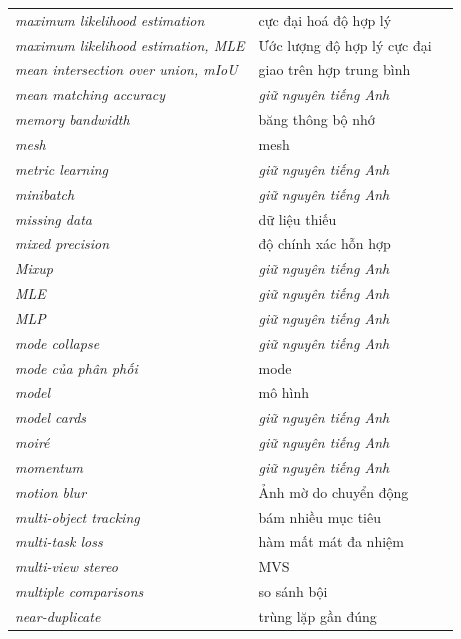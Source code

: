 \documentclass[deep_learning.tex]{subfiles}
\begin{document}
\begin{longtable}{@{}L{5.2cm}L{5.9cm}L{2.6cm}@{}}
\emph{maximum likelihood estimation} & cực đại hoá độ hợp lý & \\
\emph{maximum likelihood estimation, MLE} & Ước lượng độ hợp lý cực đại & \\
\emph{mean intersection over union, mIoU} & giao trên hợp trung bình & \\
\emph{mean matching accuracy} & \emph{\color{tiercol}giữ nguyên tiếng Anh} & \\
\emph{memory bandwidth} & băng thông bộ nhớ & \\
\emph{mesh} & mesh & \\
\emph{metric learning} & \emph{\color{tiercol}giữ nguyên tiếng Anh} & \\
\emph{minibatch} & \emph{\color{tiercol}giữ nguyên tiếng Anh} & \\
\emph{missing data} & dữ liệu thiếu & \\
\emph{mixed precision} & độ chính xác hỗn hợp & \\
\emph{Mixup} & \emph{\color{tiercol}giữ nguyên tiếng Anh} & \\
\emph{MLE} & \emph{\color{tiercol}giữ nguyên tiếng Anh} & \\
\emph{MLP} & \emph{\color{tiercol}giữ nguyên tiếng Anh} & \\
\emph{mode collapse} & \emph{\color{tiercol}giữ nguyên tiếng Anh} & \\
\emph{mode của phân phối} & mode & \\
\emph{model} & mô hình & \\
\emph{model cards} & \emph{\color{tiercol}giữ nguyên tiếng Anh} & \\
\emph{moiré} & \emph{\color{tiercol}giữ nguyên tiếng Anh} & \\
\emph{momentum} & \emph{\color{tiercol}giữ nguyên tiếng Anh} & \\
\emph{motion blur} & Ảnh mờ do chuyển động & \\
\emph{multi-object tracking} & bám nhiều mục tiêu & \\
\emph{multi-task loss} & hàm mất mát đa nhiệm & \\
\emph{multi-view stereo} & MVS & \\
\emph{multiple comparisons} & so sánh bội & \\
\emph{near-duplicate} & trùng lặp gần đúng & \\

\end{longtable}
\end{document}
